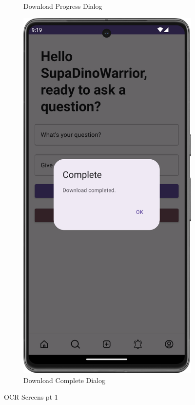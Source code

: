 \begin{figure}[H]
\begin{subfigure}[b]{0.3\textwidth}
    \caption{Download Progress Dialog}
    \label{fig:download_progress}
  \end{subfigure}
  \hfill
  \begin{subfigure}[b]{0.3\textwidth}
    \includegraphics[width=\textwidth]{Figures/Product_Images/OCR/download_complete.png}
    \caption{Download Complete Dialog}
    \label{fig:download_complete}
  \end{subfigure}
  \caption{OCR Screens pt 1}
  \label{fig:OCR_screens_1}
\end{figure}

